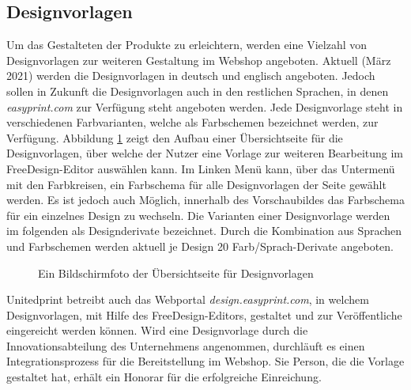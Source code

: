 \subsection{Designvorlagen}
\label{sect:Designvorlagen}
Um das Gestalteten der Produkte zu erleichtern, werden eine Vielzahl von Designvorlagen zur weiteren Gestaltung im Webshop angeboten. 
Aktuell (März 2021) werden die Designvorlagen in deutsch und englisch angeboten. Jedoch sollen in Zukunft die Designvorlagen auch in den restlichen Sprachen, in denen \emph{easyprint.com} zur Verfügung steht angeboten werden. 
Jede Designvorlage steht in verschiedenen Farbvarianten, welche als Farbschemen bezeichnet werden, zur Verfügung. Abbildung \ref{fig:Designuebersichtseite} zeigt den Aufbau einer Übersichtseite für die Designvorlagen, über welche der Nutzer eine Vorlage zur weiteren Bearbeitung im FreeDesign-Editor auswählen kann. Im Linken Menü kann, über das Untermenü mit den Farbkreisen, ein Farbschema für alle Designvorlagen der Seite gewählt werden. Es ist jedoch auch Möglich, innerhalb des Vorschaubildes das Farbschema für ein einzelnes Design zu wechseln.
Die Varianten einer Designvorlage werden im folgenden als Designderivate bezeichnet. 
Durch die Kombination aus Sprachen und Farbschemen werden aktuell je Design 20 Farb/Sprach-Derivate angeboten.
\begin{center}
\end{center}

\begin{figure}[H]
    \centering
    \caption{Ein Bildschirmfoto der Übersichtseite für Designvorlagen}
    \label{fig:Designuebersichtseite}
\end{figure}

Unitedprint betreibt auch das Webportal \emph{design.easyprint.com}, in welchem Designvorlagen, mit Hilfe des FreeDesign-Editors, gestaltet und zur Veröffentliche eingereicht werden können. Wird eine Designvorlage durch die Innovationsabteilung des Unternehmens angenommen, durchläuft es einen Integrationsprozess für die Bereitstellung im Webshop. Sie Person, die die Vorlage gestaltet hat, erhält ein Honorar für die erfolgreiche Einreichung.


